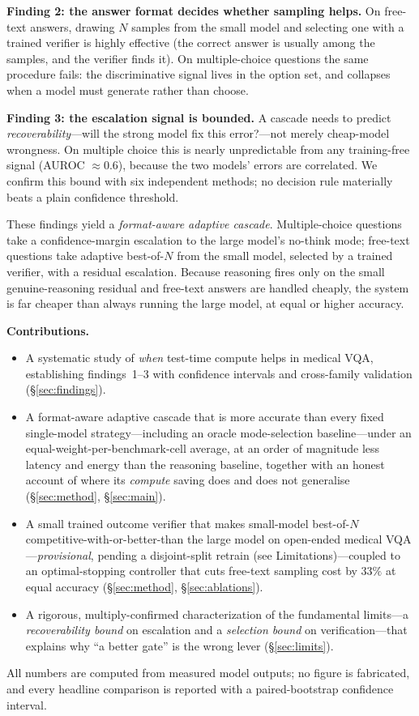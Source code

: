 \documentclass[conference]{IEEEtran}
\begin{document}
\textbf{Finding 2: the answer format decides whether sampling helps.} On free-text answers, drawing $N$ samples from the small model and selecting one with a trained verifier is highly effective (the correct answer is usually among the samples, and the verifier finds it). On multiple-choice questions the same procedure fails: the discriminative signal lives in the option set, and collapses when a model must generate rather than choose.

\textbf{Finding 3: the escalation signal is bounded.} A cascade needs to predict \emph{recoverability}---will the strong model fix this error?---not merely cheap-model wrongness. On multiple choice this is nearly unpredictable from any training-free signal (AUROC ${\approx}0.6$), because the two models' errors are correlated. We confirm this bound with six independent methods; no decision rule materially beats a plain confidence threshold.

These findings yield a \emph{format-aware adaptive cascade}. Multiple-choice questions take a confidence-margin escalation to the large model's no-think mode; free-text questions take adaptive best-of-$N$ from the small model, selected by a trained verifier, with a residual escalation. Because reasoning fires only on the small genuine-reasoning residual and free-text answers are handled cheaply, the system is far cheaper than always running the large model, at equal or higher accuracy.

\textbf{Contributions.}
\begin{itemize}
\item[\textbf{C1}] A systematic study of \emph{when} test-time compute helps in medical VQA, establishing findings~1--3 with confidence intervals and cross-family validation (\S\ref{sec:findings}).
\item[\textbf{C2}] A format-aware adaptive cascade that is more accurate than every fixed single-model strategy---including an oracle mode-selection baseline---under an equal-weight-per-benchmark-cell average, at an order of magnitude less latency and energy than the reasoning baseline, together with an honest account of where its \emph{compute} saving does and does not generalise (\S\ref{sec:method}, \S\ref{sec:main}).
\item[\textbf{C3}] A small trained outcome verifier that makes small-model best-of-$N$ competitive-with-or-better-than the large model on open-ended medical VQA---\emph{provisional}, pending a disjoint-split retrain (see Limitations)---coupled to an optimal-stopping controller that cuts free-text sampling cost by $33\%$ at equal accuracy (\S\ref{sec:method}, \S\ref{sec:ablations}).
\item[\textbf{C4}] A rigorous, multiply-confirmed characterization of the fundamental limits---a \emph{recoverability bound} on escalation and a \emph{selection bound} on verification---that explains why ``a better gate'' is the wrong lever (\S\ref{sec:limits}).
\end{itemize}
All numbers are computed from measured model outputs; no figure is fabricated, and every headline comparison is reported with a paired-bootstrap confidence interval.
\end{document}
